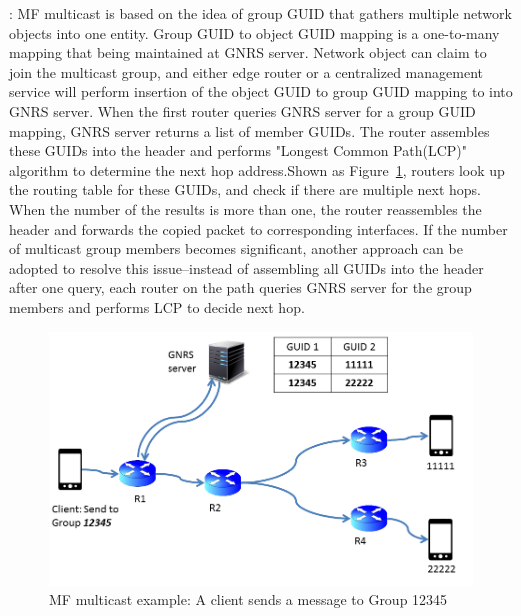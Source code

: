 \vspace{1mm}: MF multicast is based on the idea of group GUID that gathers multiple network objects into one entity. Group GUID  to object GUID mapping is a one-to-many mapping that being maintained at GNRS server. Network object can claim to join the multicast group, and either edge router or a centralized management service will perform insertion of the object GUID to group GUID mapping to into GNRS server. When the first router queries GNRS server for a group GUID mapping, GNRS server returns a list of member GUIDs. The router assembles these GUIDs into the header and performs "Longest Common Path(LCP)" algorithm to determine the next hop address.Shown as Figure~\ref{fig:multicast}, routers look up the routing table for these GUIDs, and check if there are multiple next hops. When the number of the results is more than one, the router reassembles the header and forwards the copied packet to corresponding interfaces. If the number of multicast group members becomes significant, another approach can be adopted to resolve this issue--instead of assembling all GUIDs into the header after one query, each router on the path queries GNRS server for the group members and performs LCP to decide next hop.
\vspace{-1mm}
\begin{figure}
\centering
\includegraphics[width=\columnwidth]{figure/multicast.png}
\caption{\label{fig:multicast}MF multicast example: A client sends a message to Group 12345}
\end{figure}
